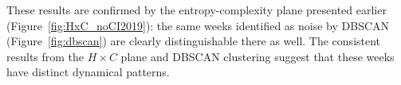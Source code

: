 \documentclass[12pt,a4paper]{article}
\begin{document}
These results are confirmed by the entropy-complexity plane presented earlier (Figure~\ref{fig:HxC_noCI2019}): the same weeks identified as noise by DBSCAN (Figure~\ref{fig:dbscan}) are clearly distinguishable there as well. The consistent results from the $H \times C$ plane and DBSCAN clustering suggest that these weeks have distinct dynamical patterns.

	


%
\end{document}
